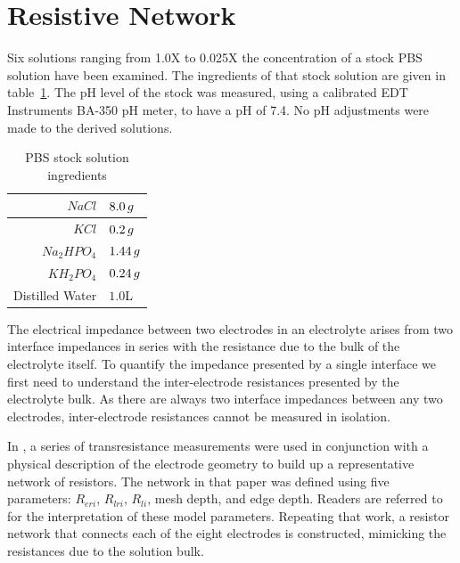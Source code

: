 \documentclass[journal, a4paper]{IEEEtran}
\begin{document}
\section{Resistive Network}
Six solutions ranging from 1.0X to 0.025X the concentration of a stock PBS solution have been examined.
The ingredients of that stock solution are given in table~\ref{tab:PBSrecipe}.
The pH level of the stock was measured, using a calibrated EDT Instruments BA-350 pH meter, to have a pH of 7.4. No pH adjustments were made to the derived solutions.

\begin{table}
    \begin{center}
        \begin{tabular}{|r|l|}
            \hline
            $NaCl$ & $8.0\thinspace g$ \\ \hline
            $KCl$ & $0.2\thinspace g$ \\ \hline
            $Na_{2}HPO_{4}$ & $1.44\thinspace g$ \\ \hline
            $KH_{2}PO_{4}$ & $0.24\thinspace g$ \\ \hline
            Distilled Water & $1.0$\thinspace L \\ \hline
        \end{tabular}
    \end{center}
    \caption{PBS stock solution ingredients}
    \label{tab:PBSrecipe}
\end{table}

The electrical impedance between two electrodes in an electrolyte arises from two interface impedances in series with the resistance due to the bulk of the electrolyte itself. To quantify the impedance presented by a single interface we first need to understand the inter-electrode resistances presented by the electrolyte bulk. As there are always two interface impedances between any two electrodes, inter-electrode resistances cannot be measured in isolation.

In \cite{ScottSingle2013}, a series of transresistance measurements were used in conjunction with a physical description of the electrode geometry to build up a representative network of resistors. The network in that paper was defined using five parameters: $R_{eri}$, $R_{lri}$, $R_{li}$, mesh depth, and edge depth. Readers are referred to \cite{ScottSingle2013} for the interpretation of these model parameters. Repeating that work, a resistor network that connects each of the eight electrodes is constructed, mimicking the resistances due to the solution bulk.
\end{document}
